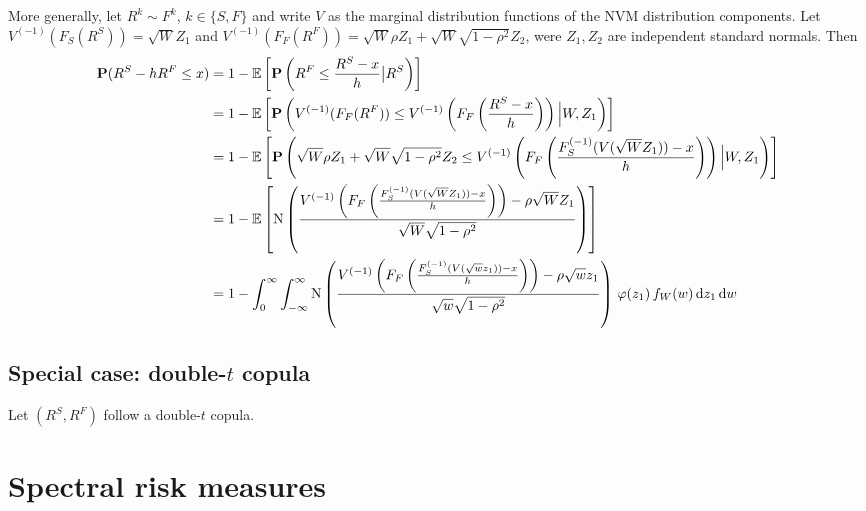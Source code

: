 \documentclass[square]{article} %
\theoremstyle{plain}
\theoremstyle{definition} %
\begin{document}
More generally, let $R^k\sim F^k$, $k\in \{S,F\}$ and write $V$
as the marginal distribution functions of the NVM distribution
components. Let $V^{(-1)}(F_S(R^S)) = \sqrt{W} Z_1$ and $V^{(-1)}(F_F(R^F)) =
\sqrt{W} \rho Z_1 + \sqrt{W} \sqrt{1-\rho^2} Z_2$, were $Z_1, Z_2$ are
independent standard normals. Then 
\begin{align*}
  \p(R^S-h R^F\leq x)
  &= 1-\E\left[ \p\left(R^F\leq \frac{R^S-x}{h}\big| R^S\right)\right] \\ %
  &= 1-\E\left[\p \left(V^{(-1)}(F_F(R^F)) \leq
    V^{(-1)}\left(F_F\left(\frac{R^S-x}{h}\right)\right) \Big|
    W, Z_1\right)\right] \\%
  &= 1-\E\left[ \p\left(\sqrt{W} \rho Z_1 + \sqrt{W} \sqrt{1-\rho^2}
    Z_2\leq V^{(-1)}\left(F_F\left(\frac{F_S^{(-1)}(V(\sqrt{W}
    Z_1))-x}{h}\right)\right) \Big| W, Z_1\right)\right]\\ %
  &= 1-\E\left[ \Ncdf \left(
    \frac{V^{(-1)}\left(F_F\left(\frac{F_S^{(-1)}(V(\sqrt{W}
    Z_1))-x}{h}\right)\right) -\rho \sqrt{W} Z_1} {
    \sqrt{W}\sqrt{1-\rho^2}}\right)\right]\\ 
  &= 1-\int_0^\infty \int_{-\infty}^{\infty} \Ncdf \left(
    \frac{V^{(-1)}\left(F_F\left(\frac{F_S^{(-1)}(V(\sqrt{w}
    z_1))-x}{h}\right)\right) -\rho\sqrt{w} z_1} { \sqrt{w}
    \sqrt{1-\rho^2}}\right) \, \varphi(z_1)\, f_W(w)\, \dd z_1\, \dd
    w%
\end{align*}

\subsection{Special case: double-$t$ copula}
\label{sec:special-case:-double}
Let $(R^S, R^F)$ follow a double-$t$ copula.



\section{Spectral risk measures}
\label{sec:spectr-risk-meas}
\end{document}
